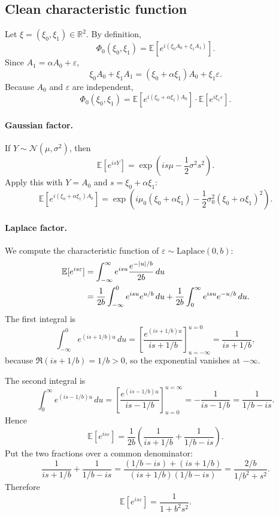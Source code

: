 \documentclass[11pt,a4paper]{article}
\newcommand{\R}{\mathbb{R}}
\newcommand{\E}{\mathbb{E}}
\begin{document}
\subsection{Clean characteristic function}

Let $\xi=(\xi_0,\xi_1)\in\R^2$. By definition,
\[
\Phi_0(\xi_0,\xi_1) = \E\!\left[e^{i(\xi_0 A_0 + \xi_1 A_1)}\right].
\]
Since $A_1 = \alpha A_0 + \varepsilon$,
\[
\xi_0 A_0 + \xi_1 A_1 = (\xi_0+\alpha\xi_1) A_0 + \xi_1 \varepsilon.
\]
Because $A_0$ and $\varepsilon$ are independent,
\begin{equation}
\Phi_0(\xi_0,\xi_1)
=
\E\!\left[e^{i(\xi_0+\alpha\xi_1)A_0}\right]
\cdot
\E\!\left[e^{i\xi_1 \varepsilon}\right].
\label{eq:cf-factor-clean}
\end{equation}

\paragraph{Gaussian factor.}
If $Y\sim\mathcal N(\mu,\sigma^2)$, then
\[
\E[e^{isY}] = \exp\!\left(is\mu - \frac12 \sigma^2 s^2\right).
\]
Apply this with $Y=A_0$ and $s=\xi_0+\alpha\xi_1$:
\begin{equation}
\E\!\left[e^{i(\xi_0+\alpha\xi_1)A_0}\right]
=
\exp\!\left(
 i\mu_0(\xi_0+\alpha\xi_1)
 - \frac12 \sigma_0^2 (\xi_0+\alpha\xi_1)^2
\right).
\label{eq:cf-a0}
\end{equation}

\paragraph{Laplace factor.}
We compute the characteristic function of $\varepsilon\sim\mathrm{Laplace}(0,b)$:
\begin{align}
\E[e^{is\varepsilon}]
&=
\int_{-\infty}^{\infty} e^{isu} \frac{e^{-|u|/b}}{2b}\,du
\notag\\
&=
\frac{1}{2b}\int_{-\infty}^{0} e^{isu} e^{u/b}\,du
+
\frac{1}{2b}\int_{0}^{\infty} e^{isu} e^{-u/b}\,du.
\label{eq:laplace-cf-split}
\end{align}
The first integral is
\[
\int_{-\infty}^{0} e^{(is+1/b)u}\,du
=
\left[\frac{e^{(is+1/b)u}}{is+1/b}\right]_{u=-\infty}^{u=0}
=
\frac{1}{is+1/b},
\]
because $\Re(is+1/b)=1/b>0$, so the exponential vanishes at $-\infty$.

The second integral is
\[
\int_{0}^{\infty} e^{(is-1/b)u}\,du
=
\left[\frac{e^{(is-1/b)u}}{is-1/b}\right]_{u=0}^{u=\infty}
=
-\frac{1}{is-1/b}
=
\frac{1}{1/b-is}.
\]
Hence
\[
\E[e^{is\varepsilon}]
=
\frac{1}{2b}
\left(
\frac{1}{is+1/b}
+
\frac{1}{1/b-is}
\right).
\]
Put the two fractions over a common denominator:
\[
\frac{1}{is+1/b} + \frac{1}{1/b-is}
=
\frac{(1/b-is)+(is+1/b)}{(is+1/b)(1/b-is)}
=
\frac{2/b}{1/b^2+s^2}.
\]
Therefore
\begin{equation}
\E[e^{is\varepsilon}] = \frac{1}{1+b^2 s^2}.
\label{eq:laplace-cf}
\end{equation}
\end{document}
